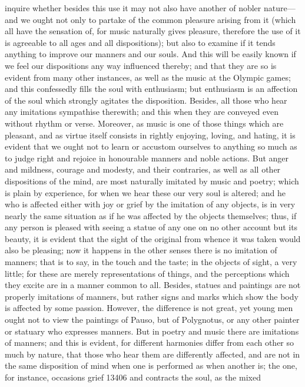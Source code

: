 inquire whether besides this use it may not also have another of nobler
nature—and we ought not only to partake of the common pleasure
arising from it (which all have the sensation of, for music naturally
gives pleasure, therefore the use of it is agreeable to all ages and all
dispositions); but also to examine if it tends anything to improve our
manners and our souls. And this will be easily known if we feel our
dispositions any way influenced thereby; and that they are so is evident
from many other instances, as well as the music at the Olympic games; and
this confessedly fills the soul with enthusiasm; but enthusiasm is an
affection of the soul which strongly agitates the disposition. Besides,
all those who hear any imitations sympathise therewith; and this when they
are conveyed even without rhythm or verse. Moreover, as music is one of
those things which are pleasant, and as virtue itself consists in rightly
enjoying, loving, and hating, it is evident that we ought not to learn or
accustom ourselves to anything so much as to judge right and rejoice in
honourable manners and noble actions. But anger and mildness, courage and
modesty, and their contraries, as well as all other dispositions of the
mind, are most naturally imitated by music and poetry; which is plain by
experience, for when we hear these our very soul is altered; and he who is
affected either with joy or grief by the imitation of any objects, is in
very nearly the same situation as if he was affected by the objects
themselves; thus, if any person is pleased with seeing a statue of any one
on no other account but its beauty, it is evident that the sight of the
original from whence it was taken would also be pleasing; now it happens
in the other senses there is no imitation of manners; that is to say, in
the touch and the taste; in the objects of sight, a very little; for these
are merely representations of things, and the perceptions which they
excite are in a manner common to all. Besides, statues and paintings are
not properly imitations of manners, but rather signs and marks which show
the body is affected by some passion. However, the difference is not
great, yet young men ought not to view the paintings of Pauso, but of
Polygnotus, or any other painter or statuary who expresses manners. But in
poetry and music there are imitations of manners; and this is evident, for
different harmonies differ from each other so much by nature, that those
who hear them are differently affected, and are not in the same
disposition of mind when one is performed as when another is; the one, for
instance, occasions grief 13406 and contracts the soul, as the mixed
